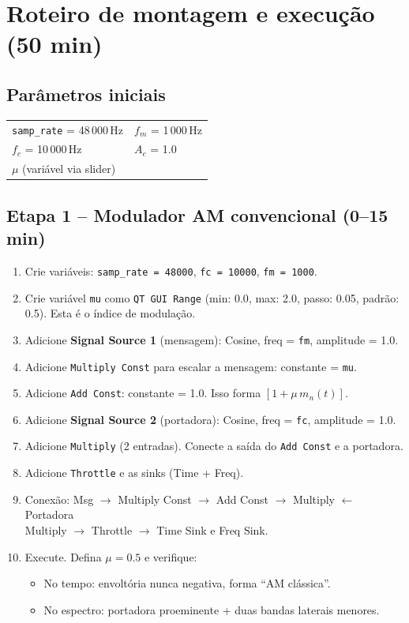 \documentclass[11pt,a4paper]{article}
\begin{document}
\section{Roteiro de montagem e execução (50 min)}

\subsection*{Parâmetros iniciais}

\begin{center}
\begin{tabular}{l l}
  \texttt{samp\_rate} = 48\,000\,Hz & $f_m$ = 1\,000\,Hz \\
  $f_c$ = 10\,000\,Hz & $A_c$ = 1.0 \\
  $\mu$ (variável via slider) & \\
\end{tabular}
\end{center}

\subsection*{Etapa 1 -- Modulador AM convencional (0--15 min)}

\begin{instrucao}
\begin{enumerate}[label=\arabic*.]
  \item Crie variáveis: \texttt{samp\_rate = 48000}, \texttt{fc = 10000},
    \texttt{fm = 1000}.
  \item Crie variável \texttt{mu} como \texttt{QT GUI Range}
    (min: 0.0, max: 2.0, passo: 0.05, padrão: 0.5). Esta é o índice de
    modulação.
  \item Adicione \textbf{Signal Source 1} (mensagem): Cosine, freq = \texttt{fm},
    amplitude = 1.0.
  \item Adicione \texttt{Multiply Const} para escalar a mensagem:
    constante = \texttt{mu}.
  \item Adicione \texttt{Add Const}: constante = 1.0.
    Isso forma $[1 + \mu\,m_n(t)]$.
  \item Adicione \textbf{Signal Source 2} (portadora): Cosine, freq = \texttt{fc},
    amplitude = 1.0.
  \item Adicione \texttt{Multiply} (2 entradas).
    Conecte a saída do \texttt{Add Const} e a portadora.
  \item Adicione \texttt{Throttle} e as sinks (Time + Freq).
  \item Conexão: Msg $\to$ Multiply Const $\to$ Add Const $\to$ Multiply
    $\leftarrow$ Portadora \\
    Multiply $\to$ Throttle $\to$ Time Sink e Freq Sink.
  \item Execute. Defina $\mu = 0.5$ e verifique:
    \begin{itemize}
      \item No tempo: envoltória nunca negativa, forma ``AM clássica''.
      \item No espectro: portadora proeminente + duas bandas laterais menores.
    \end{itemize}
\end{enumerate}
\end{instrucao}
\end{document}
